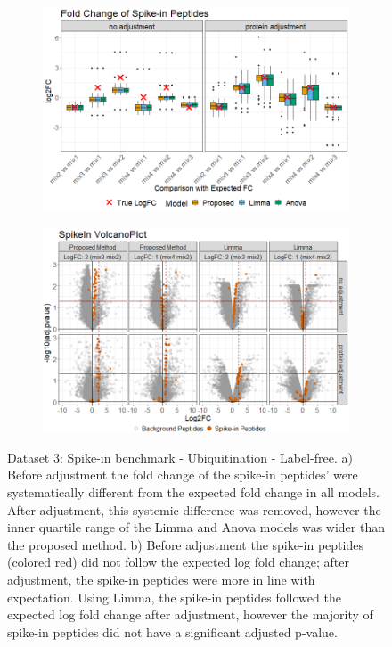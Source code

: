 \documentclass[mcp]{article}
\numberwithin{table}{section}
\begin{document}
\begin{figure}[ht]
\centering
\begin{subfigure}[c]{0.825\linewidth}
\includegraphics[width=1\textwidth]{images/spike_in_fc.png}
\caption{}
\label{fig:spikein_boxplot}
\end{subfigure}
\begin{subfigure}[c]{0.825\linewidth}
\includegraphics[width=1\textwidth]{images/spike_in_volcano.png}
\caption{}
\label{fig:spikein_prop_volcano}
\end{subfigure}
\caption{Dataset 3: Spike-in benchmark - Ubiquitination - Label-free. a) Before adjustment the fold change of the spike-in peptides' were systematically different from the expected fold change in all models. After adjustment, this systemic difference was removed, however the inner quartile range of the Limma and Anova models was wider than the proposed method. b) Before adjustment the spike-in peptides (colored red) did not follow the expected log fold change; after adjustment, the spike-in peptides were more in line with expectation. Using Limma, the spike-in peptides followed the expected log fold change after adjustment, however the majority of spike-in peptides did not have a significant adjusted p-value.}
\label{fig:spikein_volcano}
\end{figure}
\end{document}
